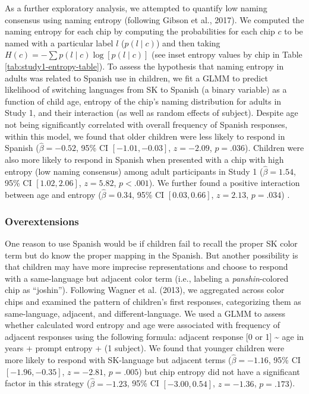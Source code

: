 \documentclass[
  english,
  ,man,floatsintext]{apa6}
\begin{document}
As a further exploratory analysis, we attempted to quantify low naming consensus using naming entropy (following Gibson et al., 2017). We computed the naming entropy for each chip by computing the probabilities for each chip \(c\) to be named with a particular label \(l\) (\(p(l \mid c)\)) and then taking \(H(c) = - \sum{p(l\mid c) \log[p(l \mid c)]}\) (see inset entropy values by chip in Table \ref{tab:study1-entropy-table}).
To assess the hypothesis that naming entropy in adults was related to Spanish use in children, we fit a GLMM to predict likelihood of switching languages from SK to Spanish (a binary variable) as a function of child age, entropy of the chip's naming distribution for adults in Study 1, and their interaction (as well as random effects of subject). Despite age not being significantly correlated with overall frequency of Spanish responses, within this model, we found that older children were less likely to respond in Spanish (\(\hat{\beta} = -0.52\), 95\% CI \([-1.01, -0.03]\), \(z = -2.09\), \(p = .036\)). Children were also more likely to respond in Spanish when presented with a chip with high entropy (low naming consensus) among adult participants in Study 1 (\(\hat{\beta} = 1.54\), 95\% CI \([1.02, 2.06]\), \(z = 5.82\), \(p < .001\)). We further found a positive interaction between age and entropy (\(\hat{\beta} = 0.34\), 95\% CI \([0.03, 0.66]\), \(z = 2.13\), \(p = .034\)) .

\hypertarget{overextensions}{%
\subsubsection{Overextensions}\label{overextensions}}

One reason to use Spanish would be if children fail to recall the proper SK color term but do know the proper mapping in the Spanish. But another possibility is that children may have more imprecise representations and choose to respond with a same-language but adjacent color term (i.e., labeling a \emph{panshin}-colored chip as \enquote{joshin}). Following Wagner et al. (2013), we aggregated across color chips and examined the pattern of children's first responses, categorizing them as same-language, adjacent, and different-language. We used a GLMM to assess whether calculated word entropy and age were associated with frequency of adjacent responses using the following formula: adjacent response {[}0 or 1{]} \textasciitilde{} age in years + prompt entropy + (1 \textbar{} subject). We found that younger children were more likely to respond with SK-language but adjacent terms (\(\hat{\beta} = -1.16\), 95\% CI \([-1.96, -0.35]\), \(z = -2.81\), \(p = .005\)) but chip entropy did not have a significant factor in this strategy (\(\hat{\beta} = -1.23\), 95\% CI \([-3.00, 0.54]\), \(z = -1.36\), \(p = .173\)).
\end{document}
